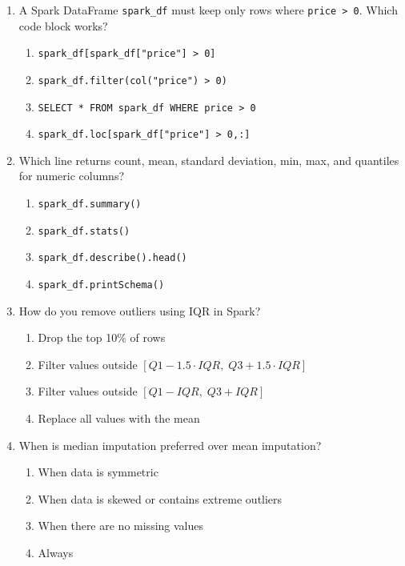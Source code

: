 \documentclass[11pt]{article}
\begin{document}
	\begin{enumerate}[leftmargin=*, label=\textbf{Q\arabic*.}, start=39]
		
		\item A Spark DataFrame \texttt{spark\_df} must keep only rows where \texttt{price > 0}. Which code block works?
		\begin{enumerate}[label=(\alph*)]
			\item \texttt{spark\_df[spark\_df["price"] > 0]}
			\item \texttt{spark\_df.filter(col("price") > 0)}
			\item \texttt{SELECT * FROM spark\_df WHERE price > 0}
			\item \texttt{spark\_df.loc[spark\_df["price"] > 0,:]}
		\end{enumerate}
		
		\item Which line returns count, mean, standard deviation, min, max, and quantiles for numeric columns?
		\begin{enumerate}[label=(\alph*)]
			\item \texttt{spark\_df.summary()}
			\item \texttt{spark\_df.stats()}
			\item \texttt{spark\_df.describe().head()}
			\item \texttt{spark\_df.printSchema()}
		\end{enumerate}
		
		\item How do you remove outliers using IQR in Spark?
		\begin{enumerate}[label=(\alph*)]
			\item Drop the top 10\% of rows
			\item Filter values outside $[Q1 - 1.5 \cdot IQR,\; Q3 + 1.5 \cdot IQR]$
			\item Filter values outside $[Q1 - IQR,\; Q3 + IQR]$
			\item Replace all values with the mean
		\end{enumerate}
		
		\item When is median imputation preferred over mean imputation?
		\begin{enumerate}[label=(\alph*)]
			\item When data is symmetric
			\item When data is skewed or contains extreme outliers
			\item When there are no missing values
			\item Always
		\end{enumerate}
		

\end{enumerate}
\end{document}
